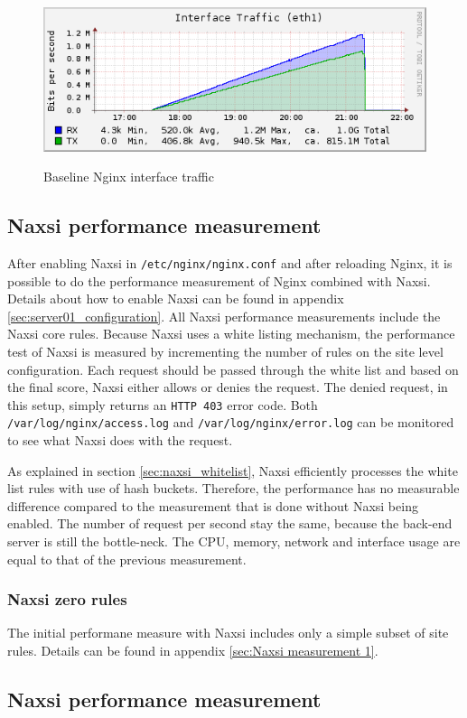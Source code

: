 \documentclass[Measurements]{subfiles}
\begin{document}
\begin{figure}[H]
\centering
\caption{Baseline Nginx interface traffic}
\includegraphics[scale=0.7]{images/results/baseline/interface.png}
\label{fig:Baseline Nginx interface traffic}
\end{figure}

\subsection{Naxsi performance measurement}

After enabling Naxsi in \verb+/etc/nginx/nginx.conf+ and after reloading Nginx, it is possible to do the performance measurement of Nginx combined with Naxsi. Details about how to enable Naxsi can be found in appendix \ref{sec:server01_configuration}. All Naxsi performance measurements include the Naxsi core rules. Because Naxsi uses a white listing mechanism, the performance test of Naxsi is measured by incrementing the number of rules on the site level configuration. Each request should be passed through the white list and based on the final score, Naxsi either allows or denies the request. The denied request, in this setup, simply returns an \verb+HTTP 403+ error code. Both \verb+/var/log/nginx/access.log+ and \verb+/var/log/nginx/error.log+ can be monitored to see what Naxsi does with the request.

As explained in section \ref{sec:naxsi_whitelist}, Naxsi efficiently processes the white list rules with use of hash buckets. Therefore, the performance has no measurable difference compared to the measurement that is done without Naxsi being enabled. The number of request per second stay the same, because the back-end server is still the bottle-neck. The CPU, memory, network and interface usage are equal to that of the previous measurement.

\subsubsection{Naxsi zero rules}
The initial performane measure with Naxsi includes only a simple subset of site rules. Details can be found in appendix \ref{sec:Naxsi measurement 1}.

\subsection{Naxsi performance measurement}
\end{document}
